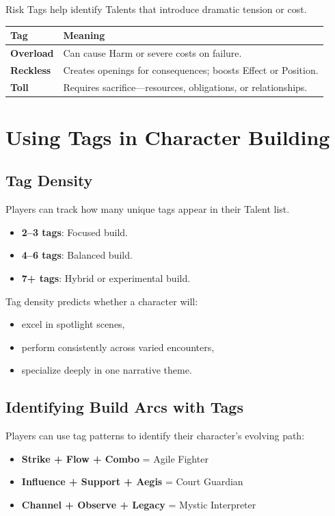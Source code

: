 \documentclass[11pt]{book}
\begin{document}
Risk Tags help identify Talents that introduce dramatic tension or cost.

\begin{longtable}{|p{3cm}|p{9cm}|}
\hline
\textbf{Tag} & \textbf{Meaning} \\ \hline
\textbf{Overload} & Can cause Harm or severe costs on failure. \\ \hline
\textbf{Reckless} & Creates openings for consequences; boosts Effect or Position. \\ \hline
\textbf{Toll} & Requires sacrifice---resources, obligations, or relationships. \\ \hline
\end{longtable}

\section{Using Tags in Character Building}

\subsection{Tag Density}
Players can track how many unique tags appear in their Talent list.

\begin{itemize}
    \item \textbf{2--3 tags}: Focused build.  
    \item \textbf{4--6 tags}: Balanced build.  
    \item \textbf{7+ tags}: Hybrid or experimental build.
\end{itemize}

Tag density predicts whether a character will:
\begin{itemize}
    \item excel in spotlight scenes,  
    \item perform consistently across varied encounters,  
    \item specialize deeply in one narrative theme.
\end{itemize}

\subsection{Identifying Build Arcs with Tags}

Players can use tag patterns to identify their character's evolving path:
\begin{itemize}
    \item \textbf{Strike + Flow + Combo} = Agile Fighter  
    \item \textbf{Influence + Support + Aegis} = Court Guardian  
    \item \textbf{Channel + Observe + Legacy} = Mystic Interpreter  
\end{itemize}
\end{document}
